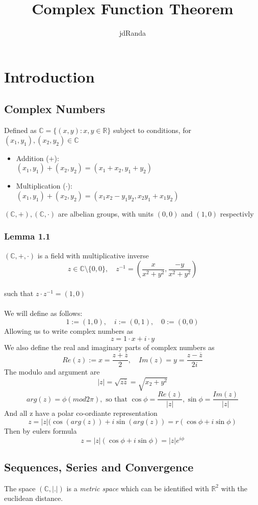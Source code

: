 \documentclass[a4paper, 12pt, twoside]{article}
\author{jdRanda}
\title{Complex Function Theorem}
\begin{document}
\maketitle
\newpage

\section{Introduction}
\subsection{Complex Numbers}
Defined as $ \mathbb{C} = \{ (x,y):x,y \in \mathbb{R} \} $
subject to conditions,  for $(x_{1}, y_{1}), (x_{2}, y_{2}) \in \mathbb{C}$
\begin{itemize}
    \item Addition ($+$):\\
    $ (x_{1}, y_{1}) + (x_{2}, y_{2}) = (x_{1}+x_{2}, y_{1}+y_{2})$
    \item Multiplication ($\cdot$):\\ $ (x_{1}, y_{1}) + (x_{2}, y_{2}) = (x_{1}x_{2}-y_{1}y_{2}, x_{2}y_{1}+x_{1}y_{2}) $
\end{itemize}
$(\mathbb{C},+), (\mathbb{C},\cdot)  $ are albelian groups, with units $(0,0)$ and $(1,0)$ respectivly
\subsubsection*{Lemma 1.1}
$(\mathbb{C},+,\cdot) $ is a field with multiplicative inverse
$$z \in \mathbb{C} \text{\textbackslash}  \{0,0\}, \quad z^{-1}=(\frac{x}{x^{2}+y^{2}},\frac{-y}{x^{2}+y^{2}})$$\\
such that $z\cdot z^{-1}=(1,0)$\\\\
\noindent We will define as follows:
$$ 1:=(1,0),\quad i:=(0,1),\quad 0:=(0,0) $$
Allowing us to write complex numbers as
$$z=1\cdot x+i\cdot y$$
We also define the real and imaginary parts of complex numbers as
$$Re(z):=x=\frac{z+\overline{z}}{2},\quad Im(z)=y=\frac{z-\overline{z}}{2i} $$
The modulo and argument are
$$|z|=\sqrt{z\overline{z}}=\sqrt{x_{2}+y^{2}} $$
$$arg(z)=\phi(mod2\pi), \text{ so that }\cos\phi=\frac{Re(z)}{|z|},\sin\phi=\frac{Im(z)}{|z|} $$
And all z have a polar co-ordiante representation
$$z=|z|(\cos(arg(z))+i\sin(arg(z))=r(\cos\phi+i\sin\phi) $$
Then by eulers formula
$$z=|z|(\cos\phi+i\sin\phi)=|z|e^{i\phi}$$

\newpage
\subsection{Sequences, Series and Convergence}
The space $(\mathbb{C},|.|)$ is a \emph{metric space} which can be identified with $\mathbb{R}^{2}$ with the euclidean distance.
\end{document}
